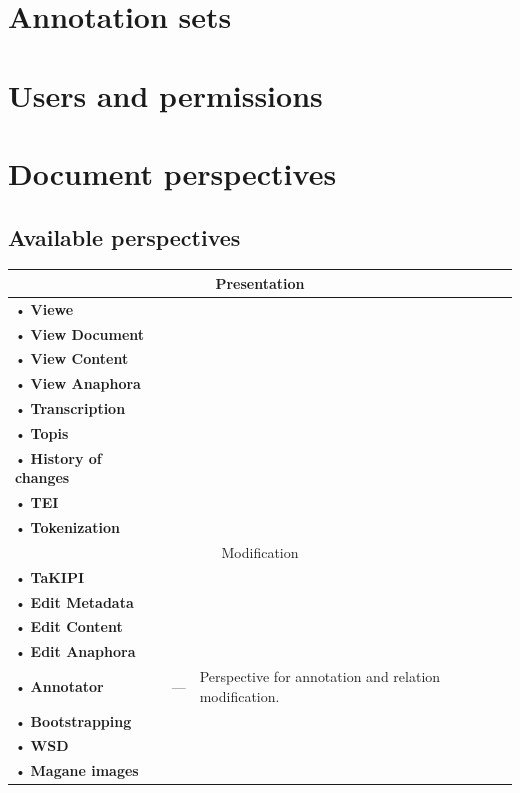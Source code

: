 \documentclass[a4paper,10pt,oneside]{scrbook}
\begin{document}
\section{Annotation sets}
\label{sec:corpus-settings-annotations}

\section{Users and permissions}

\section{Document perspectives}

\subsection{Available perspectives}

\begin{tabular}{lcp{8cm}}
  \hline
  \multicolumn{3}{c}{Presentation} \\
  \hline
  • \textbf{Viewe}\\
  • \textbf{View Document}\\
  • \textbf{View Content}\\
  • \textbf{View Anaphora}\\
  • \textbf{Transcription}\\
  • \textbf{Topis}\\
  • \textbf{History of changes}\\
  • \textbf{TEI}\\
  • \textbf{Tokenization} \\
  \hline
  \multicolumn{3}{c}{Modification}\\
  \hline
  • \textbf{TaKIPI}\\  
  • \textbf{Edit Metadata}\\
  • \textbf{Edit Content}\\
  • \textbf{Edit Anaphora}\\
  • \textbf{Annotator} & --- & Perspective for annotation and relation modification. \\
  • \textbf{Bootstrapping}\\
  • \textbf{WSD}\\
  • \textbf{Magane images}\\
  \hline
\end{tabular}
\end{document}
